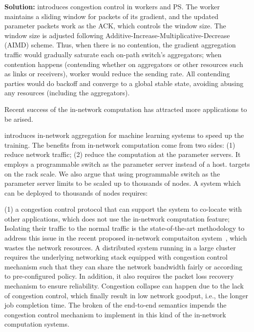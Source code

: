 \textbf{Solution:} \sysname introduces congestion control in workers and PS. The worker maintains a sliding window for packets of its gradient, and the updated parameter packets work as the ACK, which controls the window size. The window size is adjusted following Additive-Increase-Multiplicative-Decrease (AIMD) scheme. Thus, when there is no contention, the gradient aggregation traffic would gradually saturate each on-path switch's aggregators; when contention happens (contending whether on aggregators or other resources such as links or receivers), worker would reduce the sending rate. All contending parties would do backoff and converge to a global stable state, avoiding abusing any resources (including the aggregators).



Recent success of the in-network computation has attracted more 
applications to be arised.  

\switchml introduces in-network aggregation for machine learning systems
to speed up the training. The benefits from in-network computation 
come from two sides: (1) reduce network traffic; (2) reduce the computation
at the parameter servers. 
It employs a programmable switch as the parameter server instead of a host. 
\switchml targets on the rack scale. We also argue that using programmable switch
as the parameter server limits \switchml to be scaled up to 
thousands of nodes. A system which can be deployed to thousands of nodes requires:


(1) a congestion control protocol that can support the system to
co-locate with other applications, which does not use the in-network computation feature;
Isolating their traffic to the normal traffic is the state-of-the-art methodology to 
address this issue in the recent proposed in-network computaiton system~\cite{netcache, netchain, harmonia, switchml}, which wastes the network resources. 
A distributed system running in a large cluster requires the underlying networking stack equipped with 
congestion control mechanism such that they can share the network
bandwidth fairly or according to pre-configured policy.
In addition, it also requires the packet loss recovery mechanism to ensure 
reliability. Congestion collapse can happen due to the lack of congestion control, 
which finally result in low network goodput, i.e., the longer job completion time. 
The broken of the end-to-end semantics impends the congestion control mechanism to implement
in this kind of the in-network computation systems. 


